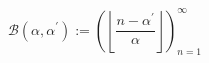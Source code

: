 \documentclass{article}
\begin{document}
\begin{titlepage}


\begin{equation*}
\mathcal{B}(\alpha ,\alpha ^{\prime })
:=
\left( \left\lfloor \frac{n-\alpha^{\prime }}{\alpha }\right\rfloor \right) _{n=1}^{\infty }
\end{equation*}


\end{titlepage}
\end{document}

